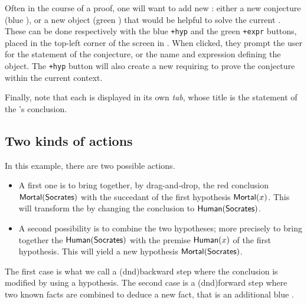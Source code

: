 \begin{scope}
Often in the course of a proof, one will want to add new : either a
new conjecture (blue ), or a new object (green ) that would be
helpful to solve the current . These can be done respectively with the
blue \texttt{+hyp} and the green \texttt{+expr} buttons, placed in the top-left
corner of the screen in . When clicked, they prompt the user
for the statement of the conjecture, or the name and expression defining the
object. The \texttt{+hyp} button will also create a new
 requiring to prove the conjecture within the current context.

Finally, note that each  is displayed in its own \emph{tab}, whose
title is the statement of the 's conclusion.

\subsection{Two kinds of actions}

\AP
In this example, there are two possible actions.

\begin{itemize}
\item A first one is to bring together, by drag-and-drop, the red conclusion
$\mbox{\textsf{Mortal}}(\mbox{\textsf{Socrates}})$ with the succedant of the first hypothesis $\mbox{\textsf{Mortal}}(x)$.
This will transform the  by changing the conclusion to
$\mbox{\textsf{Human}}(\mbox{\textsf{Socrates}})$.
\item A second possibility is to combine the two hypotheses; more precisely to
bring together the  $\mbox{\textsf{Human}}(\mbox{\textsf{Socrates}})$ with the premise $\mbox{\textsf{Human}}(x)$ of
the first hypothesis. This will yield a new hypothesis $\mbox{\textsf{Mortal}}(\mbox{\textsf{Socrates}})$.
\end{itemize}

The first case is what we call a \intro(dnd){backward} step where the conclusion
is modified by using a hypothesis. The second case is a \intro(dnd){forward}
step where two known facts are combined to deduce a new fact, that is an
additional blue .


\end{scope}
